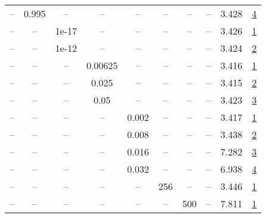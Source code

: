 \begin{table}[H]
\begin{tabular}{cccccccccc}
-- & 0.995 & -- & -- & -- & -- & -- & -- & 3.428 & \href{https://wandb.ai/stanford-mercury/optimizer-scaling/runs/sweep-130m-5B-sophiad39f61lr0.004-wd0.1-minlr0-warmup4000-b10.95-0b896b}{4} \\
-- & -- & 1e-17 & -- & -- & -- & -- & -- & 3.426 & \href{https://wandb.ai/stanford-mercury/optimizer-scaling/runs/sweep-130m-5B-sophia22c55alr0.004-wd0.1-minlr0-warmup4000-b10.95-a869ea}{1} \\
-- & -- & 1e-12 & -- & -- & -- & -- & -- & 3.424 & \href{https://wandb.ai/stanford-mercury/optimizer-scaling/runs/sweep-130m-5B-sophia67c9f3lr0.004-wd0.1-minlr0-warmup4000-b10.95-c0203d}{2} \\
-- & -- & -- & 0.00625 & -- & -- & -- & -- & 3.416 & \href{https://wandb.ai/stanford-mercury/optimizer-scaling/runs/sweep-130m-5B-sophia71fcc7lr0.004-wd0.1-minlr0-warmup4000-b10.95-b2beb6}{1} \\
-- & -- & -- & 0.025 & -- & -- & -- & -- & 3.415 & \href{https://wandb.ai/stanford-mercury/optimizer-scaling/runs/sweep-130m-5B-sophia44343dlr0.004-wd0.1-minlr0-warmup4000-b10.95-eb3b87}{2} \\
-- & -- & -- & 0.05 & -- & -- & -- & -- & 3.423 & \href{https://wandb.ai/stanford-mercury/optimizer-scaling/runs/sweep-130m-5B-sophia6a0777lr0.004-wd0.1-minlr0-warmup4000-b10.95-4324f1}{3} \\
-- & -- & -- & -- & 0.002 & -- & -- & -- & 3.417 & \href{https://wandb.ai/stanford-mercury/optimizer-scaling/runs/sweep-130m-5B-sophia79c48clr0.002-wd0.1-minlr0-warmup4000-b10.95-b4ff84}{1} \\
-- & -- & -- & -- & 0.008 & -- & -- & -- & 3.438 & \href{https://wandb.ai/stanford-mercury/optimizer-scaling/runs/sweep-130m-5B-sophia684222lr0.008-wd0.1-minlr0-warmup4000-b10.95-6fdc65}{2} \\
-- & -- & -- & -- & 0.016 & -- & -- & -- & 7.282 & \href{https://wandb.ai/stanford-mercury/optimizer-scaling/runs/sweep-130m-5B-sophia1f0f26lr0.016-wd0.1-minlr0-warmup4000-b10.95-cb9dad}{3} \\
-- & -- & -- & -- & 0.032 & -- & -- & -- & 6.938 & \href{https://wandb.ai/stanford-mercury/optimizer-scaling/runs/sweep-130m-5B-sophia10be4clr0.032-wd0.1-minlr0-warmup4000-b10.95-802464}{4} \\
-- & -- & -- & -- & -- & 256 & -- & -- & 3.446 & \href{https://wandb.ai/stanford-mercury/optimizer-scaling/runs/sweep-130m-5B-sophiab3dd57lr0.004-wd0.1-minlr0-warmup4000-b10.95-d5f058}{1} \\
-- & -- & -- & -- & -- & -- & 500 & -- & 7.811 & \href{https://wandb.ai/stanford-mercury/optimizer-scaling/runs/sweep-130m-5B-sophiaf4e4f5lr0.004-wd0.1-minlr0-warmup500-b10.95--9d14ab}{1} \\

\end{tabular}
\end{table}
